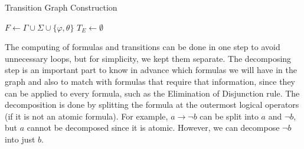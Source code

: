 \begin{algorithm}
\caption{Transition Graph Construction}
\label{alg:tg-construction}

$F \leftarrow \Gamma \cup \Sigma \cup \{\varphi, \theta\}$ 
$T_E \leftarrow \emptyset$ 



\end{algorithm}

The computing of formulas and transitions can be done in one step to avoid unnecessary loops, but for simplicity, we kept them separate. The decomposing step is an important part to know in advance which formulas we will have in the graph and also to match with formulas that require that information, since they can be applied to every formula, such as the Elimination of Disjunction rule. The decomposition is done by splitting the formula at the outermost logical operators (if it is not an atomic formula). For example, $a \to \lnot b$ can be split into $a$ and $\lnot b$, but $a$ cannot be decomposed since it is atomic. However, we can decompose $\lnot b$ into just $b$.

